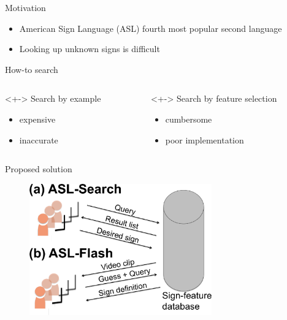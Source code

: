 	\begin{frame}{Motivation}
		\begin{itemize}
			\item<+-> American Sign Language (ASL) fourth most popular second language
			\item<+-> Looking up unknown signs is difficult 
		\end{itemize}
	\end{frame}

	\begin{frame}{How-to search}
		\centering
		\begin{columns}
			\begin{column}{0.4\textwidth}<+->
				Search by example
				\begin{itemize}
					\item expensive
					\item inaccurate
				\end{itemize}
			\end{column}

			\begin{column}{0.5\textwidth}<+->
				Search by feature selection
				\begin{itemize}
					\item cumbersome
					\item poor implementation
				\end{itemize}
			\end{column}
		\end{columns}
	\end{frame}


	\begin{frame}{Proposed solution}
		\begin{figure}
			\centering
			\includegraphics[width=0.7\textwidth]{images/ASL-overview}
		\end{figure}
	\end{frame}

